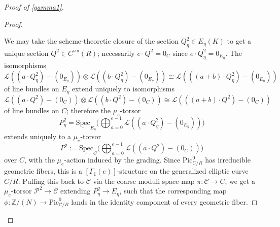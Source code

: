\documentclass[11pt]{amsart}
\theoremstyle{definition}
\begin{document}
\begin{proof}[Proof of \ref{gamma1}]
\begin{proof}
\begin{center}
\end{center}
We may take the scheme-theoretic closure of the section $Q^2_\eta \in E_\eta(K)$ to get a unique section $Q^2 \in C^{\mathrm{sm}}(R)$; necessarily $e\cdot Q^2 = 0_C$ since $e\cdot Q^2_\eta = 0_{E_\eta}$. The isomorphisms 
\begin{displaymath}
{\mathcal{L}}((a\cdot Q^2_\eta)-(0_{E_\eta})) \otimes {\mathcal{L}}((b\cdot Q^2_\eta)-(0_{E_\eta})) \cong {\mathcal{L}}(((a+b)\cdot Q^2_\eta)-(0_{E_\eta}))
\end{displaymath}
of line bundles on $E_\eta$ extend uniquely to isomorphisms 
\begin{displaymath}
{\mathcal{L}}((a\cdot Q^2)-(0_C))\otimes {\mathcal{L}}((b\cdot Q^2)-(0_C)) \cong {\mathcal{L}}(((a+b)\cdot Q^2) - (0_C))
\end{displaymath}
of line bundles on $C$; therefore the $\mu_e$-torsor 
\begin{displaymath}
P^2_\eta = \underline{\mathrm{Spec}}_{E_\eta} \big( \bigoplus_{a = 0}^{e-1} {\mathcal{L}}( (a\cdot Q^2_\eta)-(0_{E_\eta}))\big) 
\end{displaymath}
extends uniquely to a $\mu_e$-torsor 
\begin{displaymath}
P^2 := \underline{\mathrm{Spec}}_C \big( \bigoplus_{a = 0}^{e-1} {\mathcal{L}}( (a\cdot Q^2) - (0_C)) \big)
\end{displaymath}
over $C$, with the $\mu_e$-action induced by the grading. Since $\mathrm{Pic}^0_{C/R}$ has irreducible geometric fibers, this is a $[\Gamma_1(e)]$-structure on the generalized elliptic curve $C/R$. Pulling this back to ${\mathcal{C}}$ via the coarse moduli space map $\pi: {\mathcal{C}} \rightarrow C$, we get a $\mu_e$-torsor ${\mathcal{P}}^2 \rightarrow {\mathcal{C}}$ extending $P^2_\eta \rightarrow E_\eta$, such that the corresponding map $\phi: \mathbb{Z}/(N) \rightarrow \mathrm{Pic}^0_{{\mathcal{C}}/R}$ lands in the identity component of every geometric fiber.


\end{proof}
\end{proof}
\end{document}
